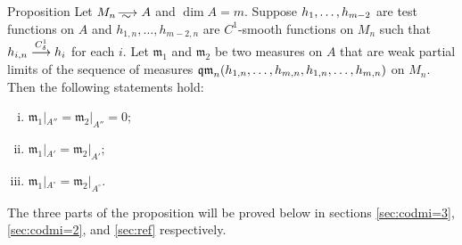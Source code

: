 \begin{thm}{Proposition}\label{prop:3parts}
Let $M_n\smooths{} A$ and $\dim A=m$.
Suppose $h_{1},\zz\dots, h_{m-2}$ are 
test functions on $A$ and
$h_{1,n},\dots, h_{m-2,n}$ are 
$C^1$-smooth functions on $M_n$ 
such that $h_{i,n}\zz\smoothto  h_i$ for each $i$.
Let $\mathfrak m_1$ and $\mathfrak m_2$ be two measures on $A$ that are weak partial limits of the sequence of measures $\qm_n( h_{1,n},\zz\dots,  h_{m,n}, h_{1,n},\zz\dots,  h_{m,n})$ on $M_n$.
Then the following statements hold:
\begin{enumerate}[(i)]
\item\label{prop:3parts:codim3} $\mathfrak m_1|_{A''}=\mathfrak m_2|_{A''}=0$;

\item\label{prop:3parts:codim2} $\mathfrak m_1|_{A'}=\mathfrak m_2|_{A'}$;

\item\label{prop:3parts:reg} $\mathfrak m_1|_{A^\circ}=\mathfrak m_2|_{A^\circ}$.
\end{enumerate}
\end{thm}

The three parts of the proposition will be proved below in sections \ref{sec:codmi=3}, \ref{sec:codmi=2}, and \ref{sec:ref} respectively.

